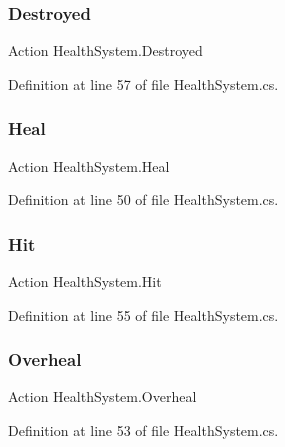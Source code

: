\subsubsection{\texorpdfstring{Destroyed}{Destroyed}}
{\footnotesize\ttfamily Action Health\+System.\+Destroyed}



Definition at line 57 of file Health\+System.\+cs.

\mbox{\label{class_health_system_ad80f0c290068df042b13b87e19329cbb}} 
\subsubsection{\texorpdfstring{Heal}{Heal}}
{\footnotesize\ttfamily Action Health\+System.\+Heal}



Definition at line 50 of file Health\+System.\+cs.

\mbox{\label{class_health_system_ac6978d7d085bfad1c33b6ddaaac113ae}} 
\subsubsection{\texorpdfstring{Hit}{Hit}}
{\footnotesize\ttfamily Action Health\+System.\+Hit}



Definition at line 55 of file Health\+System.\+cs.

\mbox{\label{class_health_system_a9f23dd550d7ab148c5051acc2d224ff5}} 
\subsubsection{\texorpdfstring{Overheal}{Overheal}}
{\footnotesize\ttfamily Action Health\+System.\+Overheal}



Definition at line 53 of file Health\+System.\+cs.

\mbox{\label{class_health_system_aa19ec8cdd69e9a033a76db175705a5a1}} 
